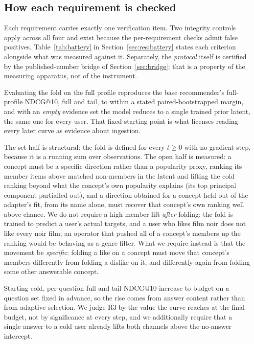 \documentclass[manuscript,screen,review]{acmart}
\begin{document}
\subsection{How each requirement is checked}
Each requirement carries exactly one verification item. Two integrity controls apply across all four and exist because the per-requirement checks admit false positives. Table~\ref{tab:battery} in Section~\ref{sec:res:battery} states each criterion alongside what was measured against it. Separately, the \emph{protocol} itself is certified by the published-number bridge of Section~\ref{sec:bridge}; that is a property of the measuring apparatus, not of the instrument.

\begin{description}[leftmargin=2.4em,itemsep=1.5pt]
  \item[R1, full strength and identity.] Evaluating the fold on the full profile reproduces the base recommender's full-profile NDCG@10, full and tail, to within a stated paired-bootstrapped margin, and with an \emph{empty} evidence set the model reduces to a single trained prior latent, the same one for every user. That fixed starting point is what licenses reading every later curve as evidence about ingestion.
  \item[R2, an open set-valued input interface.]  The set half is structural: the fold is defined for every $t\ge0$ with no gradient step, because it is a running sum over observations. The open half is measured: a concept must be a specific direction rather than a popularity proxy, ranking its member items above matched non-members in the latent and lifting the cold ranking beyond what the concept's own popularity explains (its top principal component partialled out), and a direction obtained for a concept held out of the adapter's fit, from its name alone, must recover that concept's own ranking well above chance. We do not require a high member lift \emph{after} folding: the fold is trained to predict a user's actual targets, and a user who likes film noir does not like every noir film; an operator that pushed all of a concept's members up the ranking would be behaving as a genre filter. What we require instead is that the movement be \emph{specific}: folding a like on a concept must move that concept's members differently from folding a dislike on it, and differently again from folding some other answerable concept.
  \item[R3, monotonicity.] Starting cold, per-question full and tail NDCG@10 increase to budget on a question set fixed in advance, so the rise comes from answer content rather than from adaptive selection. We judge R3 by the value the curve reaches at the final budget, not by significance at every step, and we additionally require that a single answer to a cold user already lifts both channels above the no-answer intercept.

\end{description}
\end{document}

